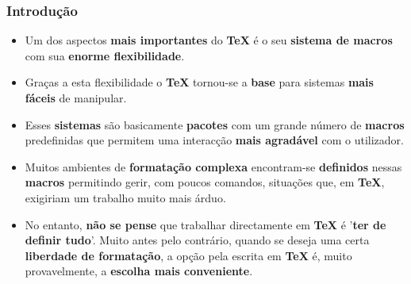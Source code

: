 \documentclass[12pt]{beamer}
\begin{document}
\begin{frame}
\frametitle{{\color{blue}\bf Introdução}}
\begin{itemize}
\item<1->Um dos aspectos {\color{DarkGreen}\bf mais importantes} 
do {\color{blue}\bf TeX}
é o seu {\color{blue}\bf sistema de macros} com sua 
{\color{DarkRed}\bf enorme flexibilidade}.
\item<2->Graças a esta flexibilidade o {\color{blue}\bf TeX} tornou-se
a {\color{red}\bf base} para sistemas {\color{DarkRed}\bf mais fáceis} de manipular.
\item<3->Esses {\color{DarkGreen}\bf sistemas} são basicamente 
{\color{red}\bf pacotes} 
com um grande número de {\color{blue}\bf macros} predefinidas que 
permitem uma interacção {\color{DarkGreen}\bf mais agradável} 
com o utilizador.
\item<4->Muitos ambientes de {\color{DarkRed}\bf formatação complexa} 
encontram-se {\color{DarkRed}\bf definidos} nessas 
{\color{blue}\bf macros} permitindo gerir, com poucos comandos,
situações que, em {\color{blue}\bf TeX}, exigiriam um trabalho
muito mais árduo.
\item<5->No entanto, {\color{DarkRed}\bf não se pense} 
que trabalhar directamente em {\color{blue}\bf TeX} é 
'{\color{DarkGreen}\bf ter de definir tudo}'. 
Muito antes pelo contrário, quando se deseja 
uma certa {\color{DarkGreen}\bf liberdade de formatação},
a opção pela escrita em {\color{blue}\bf TeX} é, muito provavelmente,
a {\color{DarkRed}\bf escolha mais conveniente}.
\end{itemize}
\end{frame}
\end{document}
